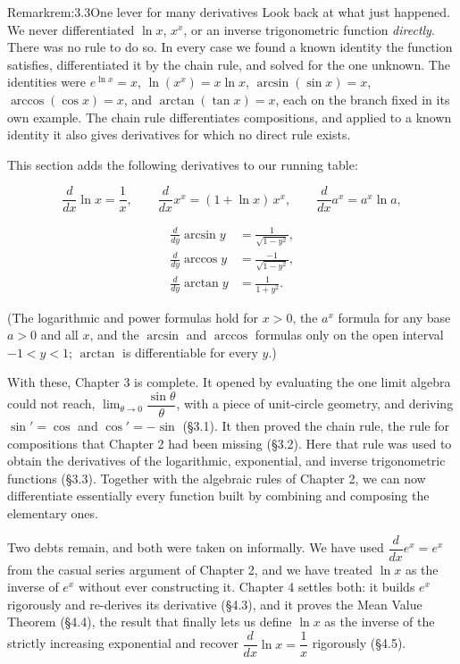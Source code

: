 \documentclass[a4paper,12pt,oneside]{memoir}
\begin{document}
\begin{envremark}{Remark}{rem:3.3}{One lever for many derivatives}
Look back at what just happened. We never differentiated \(\ln x\), \(x^{x}\), or an inverse trigonometric function \emph{directly}. There was no rule to do so. In every case we found a known identity the function satisfies, differentiated it by the chain rule, and solved for the one unknown. The identities were \(e^{\ln x} = x\), \(\ln(x^{x}) = x\ln x\), \(\arcsin(\sin x) = x\), \(\arccos(\cos x) = x\), and \(\arctan(\tan x) = x\), each on the branch fixed in its own example. The chain rule differentiates compositions, and applied to a known identity it also gives derivatives for which no direct rule exists.
\end{envremark}
This section adds the following derivatives to our running table:

\[ \frac{d}{dx}\ln x = \frac{1}{x}, \qquad \frac{d}{dx}x^{x} = (1 + \ln x)\,x^{x}, \qquad \frac{d}{dx}a^{x} = a^{x}\ln a, \]

\[ \begin{aligned}
    \frac{d}{dy}\arcsin y &= \frac{1}{\sqrt{1 - y^{2}}}, \\[2pt]
    \frac{d}{dy}\arccos y &= \frac{-1}{\sqrt{1 - y^{2}}}, \\[2pt]
    \frac{d}{dy}\arctan y &= \frac{1}{1 + y^{2}}.
  \end{aligned} \]

(The logarithmic and power formulas hold for \(x > 0\), the \(a^{x}\) formula for any base \(a > 0\) and all \(x\), and the \(\arcsin\) and \(\arccos\) formulas only on the open interval \(-1 < y < 1\); \(\arctan\) is differentiable for every \(y\).)

With these, Chapter 3 is complete. It opened by evaluating the one limit algebra could not reach, \(\lim_{\theta \to 0}\dfrac{\sin\theta}{\theta}\), with a piece of unit-circle geometry, and deriving \(\sin' = \cos\) and \(\cos' = -\sin\) (§3.1). It then proved the chain rule, the rule for compositions that Chapter 2 had been missing (§3.2). Here that rule was used to obtain the derivatives of the logarithmic, exponential, and inverse trigonometric functions (§3.3). Together with the algebraic rules of Chapter 2, we can now differentiate essentially every function built by combining and composing the elementary ones.

Two debts remain, and both were taken on informally. We have used \(\dfrac{d}{dx}e^{x} = e^{x}\) from the casual series argument of Chapter 2, and we have treated \(\ln x\) as the inverse of \(e^{x}\) without ever constructing it. Chapter 4 settles both: it builds \(e^{x}\) rigorously and re-derives its derivative (§4.3), and it proves the Mean Value Theorem (§4.4), the result that finally lets us define \(\ln x\) as the inverse of the strictly increasing exponential and recover \(\dfrac{d}{dx}\ln x = \dfrac{1}{x}\) rigorously (§4.5).
\end{document}
